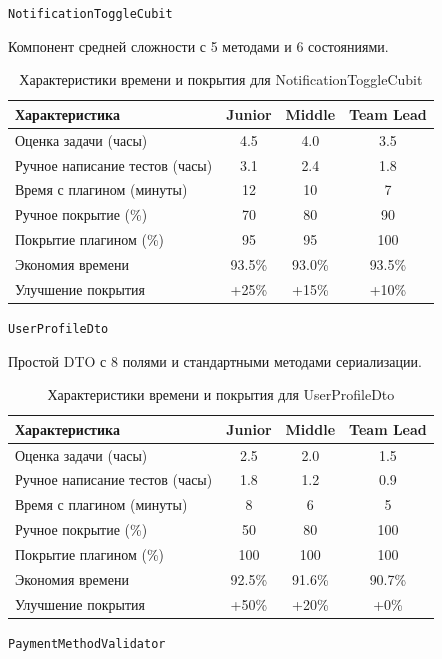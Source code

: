 \documentclass[14pt, russian]{scrartcl}
\begin{document}
\newpage
\texttt{NotificationToggleCubit}

Компонент средней сложности с 5 методами и 6 состояниями.

\begin{table}[h!]
\centering
\caption{Характеристики времени и покрытия для NotificationToggleCubit}
\begin{tabular}{|l|c|c|c|}
\hline
Характеристика & Junior & Middle & Team Lead \\
\hline
Оценка задачи (часы) & 4.5 & 4.0 & 3.5 \\
Ручное написание тестов (часы) & 3.1 & 2.4 & 1.8 \\
Время с плагином (минуты) & 12 & 10 & 7 \\
Ручное покрытие (\%) & 70 & 80 & 90 \\
Покрытие плагином (\%) & 95 & 95 & 100 \\
Экономия времени & 93.5\% & 93.0\% & 93.5\% \\
Улучшение покрытия & +25\% & +15\% & +10\% \\
\hline
\end{tabular}
\vspace{1ex}
\end{table}

\texttt{UserProfileDto}

Простой DTO с 8 полями и стандартными методами сериализации.

\begin{table}[h!]
\centering
\caption{Характеристики времени и покрытия для UserProfileDto}
\begin{tabular}{|l|c|c|c|}
\hline
Характеристика & Junior & Middle & Team Lead \\
\hline
Оценка задачи (часы) & 2.5 & 2.0 & 1.5 \\
Ручное написание тестов (часы) & 1.8 & 1.2 & 0.9 \\
Время с плагином (минуты) & 8 & 6 & 5 \\
Ручное покрытие (\%) & 50 & 80 & 100 \\
Покрытие плагином (\%) & 100 & 100 & 100 \\
Экономия времени & 92.5\% & 91.6\% & 90.7\% \\
Улучшение покрытия & +50\% & +20\% & +0\% \\
\hline
\end{tabular}
\vspace{1ex}
\end{table}

\texttt{PaymentMethodValidator}
\end{document}
